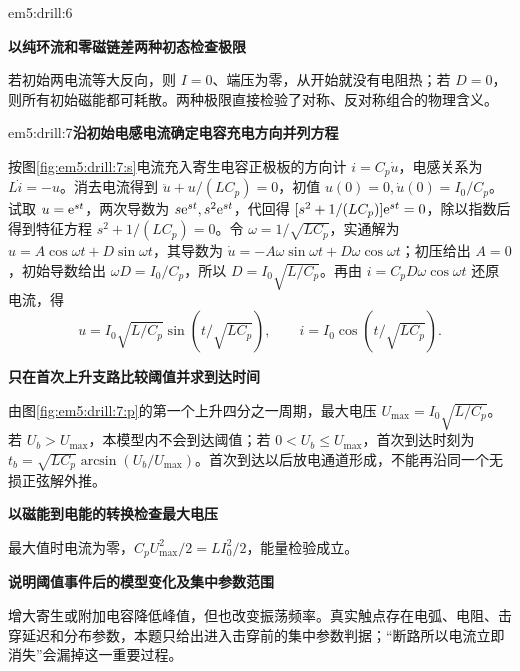 \begin{drillsolution}{em5:drill:6}
\par\medskip{}\noindent\textbf{以纯环流和零磁链差两种初态检查极限}\par\nobreak
若初始两电流等大反向，则 $I=0$、端压为零，从开始就没有电阻热；若 $D=0$，则所有初始磁能都可耗散。两种极限直接检验了对称、反对称组合的物理含义。\end{drillsolution}
\begin{drillsolution}{em5:drill:7}\textbf{沿初始电感电流确定电容充电方向并列方程}\par\nobreak
按图\ref{fig:em5:drill:7:s}电流充入寄生电容正极板的方向计 $i=C_p\dot u$，电感关系为 $L\dot i=-u$。消去电流得到 $\ddot u+u/(LC_p)=0$，初值 $u(0)=0,\dot u(0)=I_0/C_p$。试取 $u=\mathrm e^{st}$，两次导数为 $s\mathrm e^{st},s^2\mathrm e^{st}$，代回得 $[s^2+1/(LC_p)]\mathrm e^{st}=0$，除以指数后得到特征方程 $s^2+1/(LC_p)=0$。令 $\omega=1/\sqrt{LC_p}$，实通解为 $u=A\cos\omega t+D\sin\omega t$，其导数为 $\dot u=-A\omega\sin\omega t+D\omega\cos\omega t$；初压给出 $A=0$，初始导数给出 $\omega D=I_0/C_p$，所以 $D=I_0\sqrt{L/C_p}$。再由 $i=C_pD\omega\cos\omega t$ 还原电流，得
\[u=I_0\sqrt{L/C_p}\sin(t/\sqrt{LC_p}),\qquad i=I_0\cos(t/\sqrt{LC_p}).\]



\par\medskip{}\noindent\textbf{只在首次上升支路比较阈值并求到达时间}\par\nobreak
由图\ref{fig:em5:drill:7:p}的第一个上升四分之一周期，最大电压 $U_{\max}=I_0\sqrt{L/C_p}$。若 $U_b>U_{\max}$，本模型内不会到达阈值；若 $0<U_b\le U_{\max}$，首次到达时刻为 $t_b=\sqrt{LC_p}\arcsin(U_b/U_{\max})$。首次到达以后放电通道形成，不能再沿同一个无损正弦解外推。



\par\medskip{}\noindent\textbf{以磁能到电能的转换检查最大电压}\par\nobreak
最大值时电流为零，$C_pU_{\max}^2/2=LI_0^2/2$，能量检验成立。

\par\medskip{}\noindent\textbf{说明阈值事件后的模型变化及集中参数范围}\par\nobreak
增大寄生或附加电容降低峰值，但也改变振荡频率。真实触点存在电弧、电阻、击穿延迟和分布参数，本题只给出进入击穿前的集中参数判据；“断路所以电流立即消失”会漏掉这一重要过程。\end{drillsolution}
